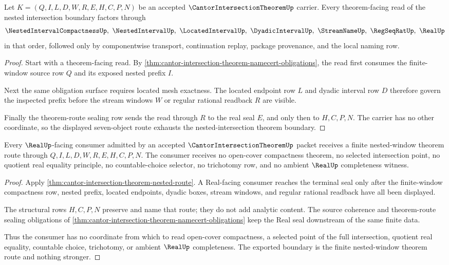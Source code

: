 \begin{theorem}
\label{thm:cantor-intersection-theorem-nested-route}
Let $K=(Q,I,L,D,W,R,E,H,C,P,N)$ be an accepted $\CantorIntersectionTheoremUp$ carrier. Every theorem-facing read of the nested intersection boundary factors through
$$
\NestedIntervalCompactnessUp,\ \NestedIntervalUp,\ \LocatedIntervalUp,\ \DyadicIntervalUp,\ \StreamNameUp,\ \RegSeqRatUp,\ \RealUp
$$
in that order, followed only by componentwise transport, continuation replay, package provenance, and the local naming row.
\end{theorem}
\begin{proof}
Start with a theorem-facing read. By \autoref{thm:cantor-intersection-theorem-namecert-obligations}, the read first consumes the finite-window source row $Q$ and its exposed nested prefix $I$.

Next the same obligation surface requires located mesh exactness. The located endpoint row $L$ and dyadic interval row $D$ therefore govern the inspected prefix before the stream windows $W$ or regular rational readback $R$ are visible.

Finally the theorem-route sealing row sends the read through $R$ to the real seal $E$, and only then to $H,C,P,N$. The carrier has no other coordinate, so the displayed seven-object route exhausts the nested-intersection theorem boundary.
\end{proof}

\begin{theorem}
\label{thm:cantor-intersection-theorem-real-seal-nonescape}
Every $\RealUp$-facing consumer admitted by an accepted $\CantorIntersectionTheoremUp$ packet receives a finite nested-window theorem route through $Q,I,L,D,W,R,E,H,C,P,N$. The consumer receives no open-cover compactness theorem, no selected intersection point, no quotient real equality principle, no countable-choice selector, no trichotomy row, and no ambient $\RealUp$ completeness witness.
\end{theorem}
\begin{proof}
Apply \autoref{thm:cantor-intersection-theorem-nested-route}. A Real-facing consumer reaches the terminal seal only after the finite-window compactness row, nested prefix, located endpoints, dyadic boxes, stream windows, and regular rational readback have all been displayed.

The structural rows $H,C,P,N$ preserve and name that route; they do not add analytic content. The source coherence and theorem-route sealing obligations of \autoref{thm:cantor-intersection-theorem-namecert-obligations} keep the Real seal downstream of the same finite data.

Thus the consumer has no coordinate from which to read open-cover compactness, a selected point of the full intersection, quotient real equality, countable choice, trichotomy, or ambient $\RealUp$ completeness. The exported boundary is the finite nested-window theorem route and nothing stronger.
\end{proof}

